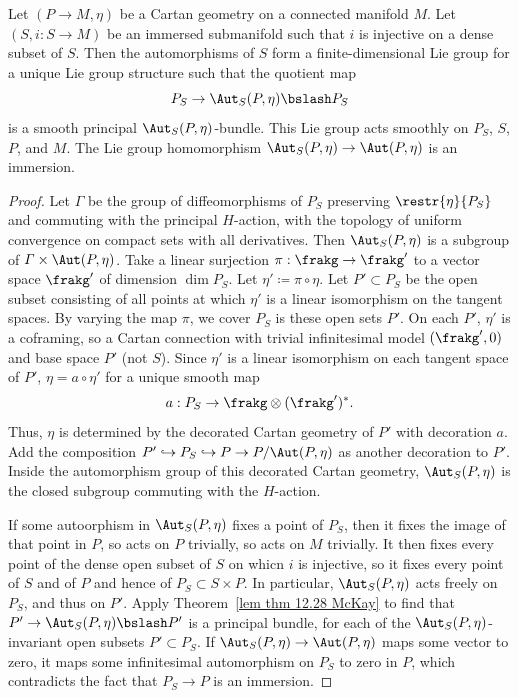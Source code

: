 \begin{thm}
    Let $(P\to M,\eta)$ be a Cartan geometry on a connected manifold $M$. Let $(S,i:S\to M)$ be an immersed submanifold such that $i$ is injective on a dense subset of $S$. Then the automorphisms of $S$ form a finite-dimensional Lie group for a unique Lie group structure such that the quotient map 
    \[P_S\to \Aut_S(P,\eta)\bslash P_S\]
    is a smooth principal $\Aut_S(P,\eta)$-bundle. This Lie group acts smoothly on $P_S$, $S$, $P$, and $M$. The Lie group homomorphism $\Aut_S(P,\eta)\to \Aut(P,\eta)$ is an immersion.
\end{thm}
\begin{proof}
    Let $\varGamma$ be the group of diffeomorphisms of $P_S$ preserving $\restr{\eta}{P_S}$ and commuting with the principal $H$-action, with the topology of uniform convergence on compact sets with all derivatives. Then $\Aut_S(P,\eta)$ is a subgroup of $\varGamma\times \Aut(P,\eta)$. Take a linear surjection $\pi:\frakg\to \frakg'$ to a vector space $\frakg'$ of dimension $\dim P_S$. Let $\eta'\coloneqq \pi\circ\eta$. Let $P'\subset P_S$ be the open subset consisting of all points at which $\eta'$ is a linear isomorphism on the tangent spaces. By varying the map $\pi$, we cover $P_S$ is these open sets $P'$. On each $P'$, $\eta'$ is a coframing, so a Cartan connection with trivial infinitesimal model $(\frakg',0)$ and base space $P'$ (not $S$). Since $\eta'$ is a linear isomorphism on each tangent space of $P'$, $\eta=a\circ \eta'$ for a unique smooth map 
    \[a:P_S\to \frakg\otimes(\frakg')^\ast.\]
    Thus, $\eta$ is determined by the decorated Cartan geometry of $P'$ with decoration $a$. Add the composition $P'\hookrightarrow P_S\hookrightarrow P\to P\slash \Aut(P,\eta)$
    as another decoration to $P'$. Inside the automorphism group of this decorated Cartan geometry, $\Aut_S(P,\eta)$ is the closed subgroup commuting with the $H$-action.

    If some autoorphism in $\Aut_S(P,\eta)$ fixes a point of $P_S$, then it fixes the image of that point in $P$, so acts on $P$ trivially, so acts on $M$ trivially. It then fixes every point of the dense open subset of $S$ on whicn $i$ is injective, so it fixes every point of $S$ and of $P$ and hence of $P_S\subset S\times P$. In particular, $\Aut_S(P,\eta)$ acts freely on $P_S$, and thus on $P'$. Apply Theorem~\ref{lem thm 12.28 McKay} to find that $P'\to \Aut_S(P,\eta)\bslash P'$ is a principal bundle, for each of the $\Aut_S(P,\eta)$-invariant open subsets $P'\subset P_S$. If $\Aut_S(P,\eta)\to \Aut(P,\eta)$ maps some vector to zero, it maps some infinitesimal automorphism on $P_S$ to zero in $P$, which contradicts the fact that $P_S\to P$ is an immersion. 
\end{proof}

